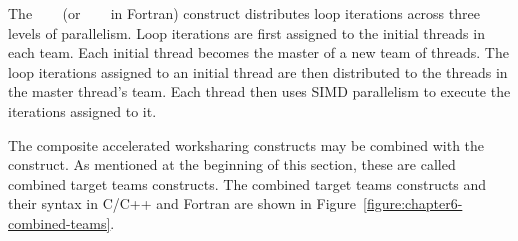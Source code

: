 The ~~~ (or
~~~ in Fortran)  construct
distributes loop iterations across three levels of parallelism.  Loop
iterations are first assigned to the initial threads in each team.  Each
initial thread becomes the master of a new team of threads.  The loop
iterations assigned to an initial thread are then distributed to the threads in
the master thread's team.  Each thread then uses SIMD parallelism to execute
the iterations assigned to it.

The composite accelerated worksharing constructs may be combined with the
 construct.  As mentioned at the beginning of this section,
these are called combined target teams constructs.  The combined target teams
constructs and their syntax in C/C++ and Fortran are shown in
Figure~\ref{figure:chapter6-combined-teams}.  

